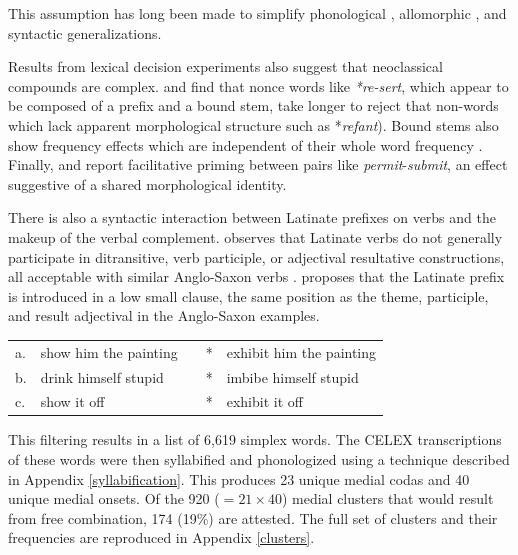 This assumption has long been made to simplify phonological \citep{SPE}, allomorphic \citep[11f.]{Aronoff1976}, and syntactic \citep{Harley2009} generalizations. 

Results from lexical decision experiments also suggest that neoclassical compounds are complex. \citet{Taft1986} and \citet{Taft1975,Taft1976} find that nonce words like \emph{*re-sert}, which appear to be composed of a prefix and a bound stem, take longer to reject that non-words which lack apparent morphological structure such as *\emph{refant}). Bound stems also show frequency effects which are independent of their whole word frequency \citep{Taft1979,Taft2006}. Finally, \citet{Emmorey1989} and \citet{Forster2000} report facilitative priming between pairs like \emph{permit}-\emph{submit}, an effect suggestive of a shared morphological identity.  

There is also a syntactic interaction between Latinate prefixes on verbs and the makeup of the verbal complement. \citet{Harley2009} observes that Latinate verbs do not generally participate in ditransitive, verb participle, or adjectival resultative constructions, all acceptable with similar Anglo-Saxon verbs \citep[see also][]{Gropen1989,Coppock2008}. \citeauthor{Harley2009} proposes that the Latinate prefix is introduced in a low small clause, the same position as the theme, participle, and result adjectival in the Anglo-Saxon examples.

\begin{example} 
\label{harley}
\begin{tabular}{l l l l@{} l}
a. & {show him the painting} & \alt{} & * & {exhibit him the painting} \\
b. & {drink himself stupid}  & \alt{} & * & {imbibe himself stupid}    \\
c. & {show it off}           & \alt{} & * & {exhibit it off}           \\
\end{tabular}
\end{example}

This filtering results in a list of 6,619 simplex words. The CELEX transcriptions of these words were then syllabified and phonologized using a technique described in Appendix \ref{syllabification}. This produces 23 unique medial codas and 40 unique medial onsets. Of the 920 ($= 21 \times 40$) medial clusters that would result from free combination, 174 (19\%) are attested. The full set of clusters and their frequencies are reproduced in Appendix \ref{clusters}. 

